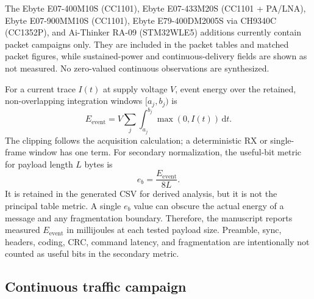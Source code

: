\documentclass[10pt,a4paper]{article}
\begin{document}
The Ebyte E07-400M10S (CC1101), Ebyte E07-433M20S (CC1101 + PA/LNA), Ebyte E07-900MM10S (CC1101), Ebyte E79-400DM2005S via CH9340C (CC1352P), and Ai-Thinker RA-09 (STM32WLE5) additions currently contain packet campaigns only. They are included in the packet tables and matched packet figures, while sustained-power and continuous-delivery fields are shown as not measured. No zero-valued continuous observations are synthesized.

For a current trace $I(t)$ at supply voltage $V$, event energy over the retained, non-overlapping integration windows $[a_j,b_j)$ is
\begin{equation}
  E_{\mathrm{event}} = V \sum_j \int_{a_j}^{b_j} \max(0,I(t))\,\mathrm{d}t.
\end{equation}
The clipping follows the acquisition calculation; a deterministic RX or single-frame window has one term.
For secondary normalization, the useful-bit metric for payload length $L$ bytes is
\begin{equation}
  e_b = \frac{E_{\mathrm{event}}}{8L}.
\end{equation}
It is retained in the generated CSV for derived analysis, but it is not the principal table metric. A single $e_b$ value can obscure the actual energy of a message and any fragmentation boundary. Therefore, the manuscript reports measured $E_{\mathrm{event}}$ in millijoules at each tested payload size. Preamble, sync, headers, coding, CRC, command latency, and fragmentation are intentionally not counted as useful bits in the secondary metric.

\subsection{Continuous traffic campaign}
\end{document}
